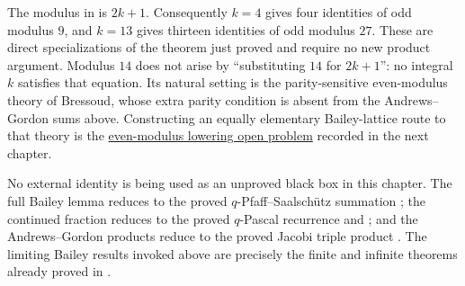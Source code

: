 \begin{remark}
The modulus in  is \(2k+1\).  Consequently
\(k=4\) gives four identities of odd modulus \(9\), and \(k=13\) gives
thirteen identities of odd modulus \(27\).  These are direct specializations
of the theorem just proved and require no new product argument.  Modulus \(14\)
does not arise by ``substituting \(14\) for \(2k+1\)'': no integral \(k\)
satisfies that equation.  Its natural setting is the parity-sensitive
even-modulus theory of Bressoud, whose extra parity condition is absent from
the Andrews--Gordon sums above.  Constructing an equally elementary
Bailey-lattice route to that theory is the
\hyperref[qg:prob-even-modulus-lowering]{even-modulus lowering open problem}
recorded in the next chapter.
\end{remark}

\begin{remark}
\label{qg:rem:bailey-andrews-gordon-dependencies}
No external identity is being used as an unproved black box in this chapter.
The full Bailey lemma reduces to the proved
\(q\)-Pfaff--Saalsch\"utz summation ; the
continued fraction reduces to the proved \(q\)-Pascal recurrence and
; and the Andrews--Gordon products reduce to
the proved Jacobi triple product .  The limiting Bailey
results invoked above are precisely the finite and infinite theorems already
proved in .
\end{remark}
